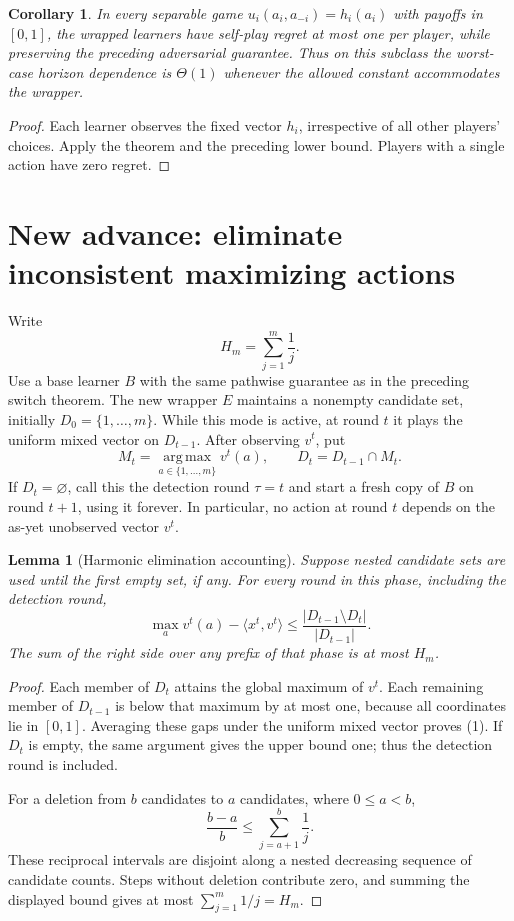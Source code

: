 \documentclass[11pt]{article}
\newtheorem{lemma}{Lemma}
\newtheorem{corollary}{Corollary}
\theoremstyle{definition}
\theoremstyle{remark}
\begin{document}
\begin{corollary}
In every separable game $u_i(a_i,a_{-i})=h_i(a_i)$ with payoffs in $[0,1]$, the wrapped learners have self-play regret at most one per player, while preserving the preceding adversarial guarantee. Thus on this subclass the worst-case horizon dependence is $\Theta(1)$ whenever the allowed constant accommodates the wrapper.
\end{corollary}
\begin{proof}
Each learner observes the fixed vector $h_i$, irrespective of all other players' choices. Apply the theorem and the preceding lower bound. Players with a single action have zero regret.
\end{proof}


\section{New advance: eliminate inconsistent maximizing actions}
Write
\[
 H_m=\sum_{j=1}^m\frac1j.
\]
Use a base learner $B$ with the same pathwise guarantee as in the preceding
switch theorem. The new wrapper $E$ maintains a nonempty candidate set,
initially $D_0=\{1,\ldots,m\}$. While this mode is active, at round $t$
it plays the uniform mixed vector on $D_{t-1}$. After observing $v^t$, put
\[
 M_t=\operatorname*{arg\,max}_{a\in\{1,\ldots,m\}}v^t(a),
 \qquad D_t=D_{t-1}\cap M_t.
\]
If $D_t=\varnothing$, call this the detection round $\tau=t$ and start a
fresh copy of $B$ on round $t+1$, using it forever. In particular, no action
at round $t$ depends on the as-yet unobserved vector $v^t$.

\begin{lemma}[Harmonic elimination accounting]\label{lem:harmonic}
Suppose nested candidate sets are used until the first empty set, if any.
For every round in this phase, including the detection round,
\[
 \max_a v^t(a)-\langle x^t,v^t\rangle
 \leq \frac{|D_{t-1}\setminus D_t|}{|D_{t-1}|}.
                                                        \tag{1}
\]
The sum of the right side over any prefix of that phase is at most $H_m$.
\end{lemma}
\begin{proof}
Each member of $D_t$ attains the global maximum of $v^t$. Each remaining
member of $D_{t-1}$ is below that maximum by at most one, because all
coordinates lie in $[0,1]$. Averaging these gaps under the uniform mixed
vector proves (1). If $D_t$ is empty, the same argument gives the upper
bound one; thus the detection round is included.

For a deletion from $b$ candidates to $a$ candidates, where $0\leq a<b$,
\[
 \frac{b-a}{b}\leq\sum_{j=a+1}^{b}\frac1j.
\]
These reciprocal intervals are disjoint along a nested decreasing sequence
of candidate counts. Steps without deletion contribute zero, and summing
the displayed bound gives at most $\sum_{j=1}^m1/j=H_m$.
\end{proof}
\end{document}
